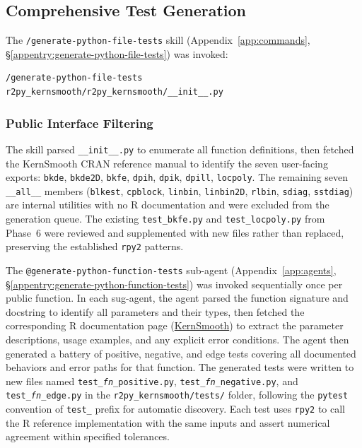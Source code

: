 \documentclass[12pt,a4paper]{article}
\begin{document}
\subsection{Comprehensive Test Generation}

The \texttt{/generate-python-file-tests} skill (Appendix~\ref{app:commands}, \S\ref{appentry:generate-python-file-tests}) was invoked:

\begin{lstlisting}[style=shell]
/generate-python-file-tests r2py_kernsmooth/r2py_kernsmooth/__init__.py
\end{lstlisting}

\subsubsection{Public Interface Filtering}

The skill parsed \texttt{\_\_init\_\_.py} to enumerate all function definitions, then fetched the KernSmooth CRAN reference manual to identify the seven user-facing exports: \texttt{bkde}, \texttt{bkde2D}, \texttt{bkfe}, \texttt{dpih}, \texttt{dpik}, \texttt{dpill}, \texttt{locpoly}. The remaining seven \texttt{\_\_all\_\_} members (\texttt{blkest}, \texttt{cpblock}, \texttt{linbin}, \texttt{linbin2D}, \texttt{rlbin}, \texttt{sdiag}, \texttt{sstdiag}) are internal utilities with no R documentation and were excluded from the generation queue. The existing \texttt{test\_bkfe.py} and \texttt{test\_locpoly.py} from Phase~6 were reviewed and supplemented with new files rather than replaced, preserving the established \texttt{rpy2} patterns.

The \texttt{@generate-python-function-tests} sub-agent (Appendix~\ref{app:agents}, \S\ref{appentry:generate-python-function-tests}) was invoked sequentially once per public function. In each sug-agent, the agent parsed the function signature and docstring to identify all parameters and their types, then fetched the corresponding R documentation page (\href{https://cran.r-project.org/web/packages/KernSmooth/refman/KernSmooth.html}{KernSmooth}) to extract the parameter descriptions, usage examples, and any explicit error conditions. The agent then generated a battery of positive, negative, and edge tests covering all documented behaviors and error paths for that function. The generated tests were written to new files named \texttt{test\_\textit{fn}\_positive.py}, \texttt{test\_\textit{fn}\_negative.py}, and \texttt{test\_\textit{fn}\_edge.py} in the \texttt{r2py\_kernsmooth/tests/} folder, following the \texttt{pytest} convention of \texttt{test\_} prefix for automatic discovery. Each test uses \texttt{rpy2} to call the R reference implementation with the same inputs and assert numerical agreement within specified tolerances.
\end{document}
